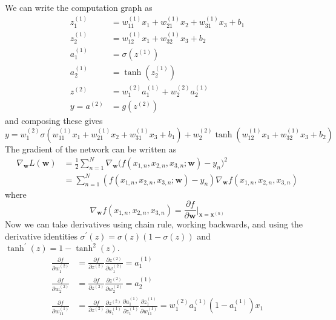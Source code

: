 \documentclass{article}
\begin{document}
  \begin{solution}
    We can write the computation graph as 
    \begin{align} 
      z_1^{(1)} & = w_{11}^{(1)} x_1 + w_{21}^{(1)} x_2 + w_{31}^{(1)} x_3 + b_1 \\
      z_2^{(1)} & = w_{12}^{(1)} x_1 + w_{32}^{(1)} x_3 + b_2 \\
      a_1^{(1)} & = \sigma(z^{(1)})\\
      a_2^{(1)} & = \tanh(z_2^{(1)}) \\
      z^{(2)} & = w_{1}^{(2)} a_1^{(1)} + w_2^{(2)} a_2^{(1)} \\
      y = a^{(2)} & = g(z^{(2)})
    \end{align}
    and composing these gives 
    \begin{equation}
      y = w_1^{(2)} \sigma(w_{11}^{(1)} x_1  + w_{21}^{(1)} x_2 + w_{31}^{(1)} x_3 + b_1) + w_2^{(2)} \tanh(w_{12}^{(1)} x_1 + w_{32}^{(1)} x_3 + b_2)
    \end{equation}
    The gradient of the network can be written as 
    \begin{align}
      \nabla_\mathbf{w} L(\mathbf{w}) & = \frac{1}{2} \sum_{n=1}^N \nabla_\mathbf{w} \big( f(x_{1, n}, x_{2, n}, x_{3, n}; \mathbf{w}) - y_n \big)^2 \\
      & = \sum_{n=1}^N (f(x_{1, n}, x_{2, n}, x_{3, n}; \mathbf{w}) - y_n) \nabla_\mathbf{w} f(x_{1, n}, x_{2, n}, x_{3, n})
    \end{align}
    where 
    \begin{equation}
      \nabla_\mathbf{w} f(x_{1, n}, x_{2, n}, x_{3, n}) = \frac{\partial f}{\partial \mathbf{w}} \bigg|_{\mathbf{x} = \mathbf{x}^{(n)}}
    \end{equation}
    Now we can take derivatives using chain rule, working backwards, and using the derivative identities $\sigma^\prime (z)  = \sigma(z) (1 - \sigma(z))$ and $\tanh^\prime (z) = 1 - \tanh^2 (z)$. 
    \begin{align}
        \frac{\partial f}{\partial w_1^{(2)}} & = \frac{\partial f}{\partial z^{(2)}} \frac{\partial z^{(2)}}{\partial w_1^{(2)}} = a_1^{(1)} \\
        \frac{\partial f}{\partial w_2^{(2)}} & = \frac{\partial f}{\partial z^{(2)}} \frac{\partial z^{(2)}}{\partial w_2^{(2)}} = a_2^{(1)} \\ 
        \frac{\partial f}{\partial w_{11}^{(1)}} & = \frac{\partial f}{\partial z^{(2)}} \frac{\partial z^{(2)}}{\partial a^{(1)}_1} \frac{\partial a^{(1)}_1}{\partial z_1^{(1)}} \frac{\partial z_1^{(1)}}{\partial w_{11}^{(1)}} = w_1^{(2)} a_1^{(1)} (1 - a_1^{(1)}) x_1\\

\end{align}
\end{solution}
\end{document}
